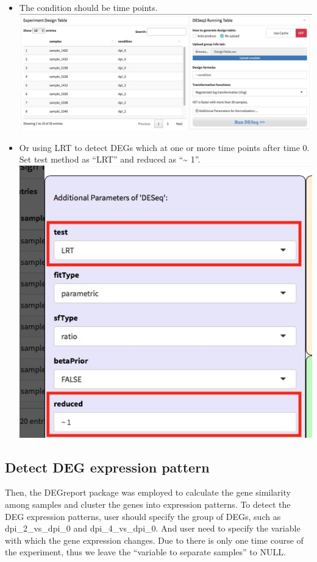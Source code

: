 \documentclass[
  a4paper,
  oneside]{book}
\providecommand{\tightlist}{%
  \setlength{\itemsep}{0pt}\setlength{\parskip}{0pt}}
\begin{document}
\begin{itemize}
\tightlist
\item
  The condition should be time points.
  \includegraphics{images/degp_ow_designtable.jpeg}
\item
  Or using LRT to detect DEGs which at one or more time points after time 0. Set test method as ``LRT'' and reduced as ``\textasciitilde{} 1''.
  \includegraphics{images/degp_ow_designtable_lrt.jpeg}
\end{itemize}

\hypertarget{detect-deg-expression-pattern}{%
\subsection{Detect DEG expression pattern}\label{detect-deg-expression-pattern}}

Then, the DEGreport package was employed to calculate the gene similarity among samples and cluster the genes into expression patterns. To detect the DEG expression patterns, user should specify the group of DEGs, such as dpi\_2\_vs\_dpi\_0 and dpi\_4\_vs\_dpi\_0. And user need to specify the variable with which the gene expression changes. Due to there is only one time course of the experiment, thus we leave the ``variable to separate samples'' to NULL.
\end{document}
